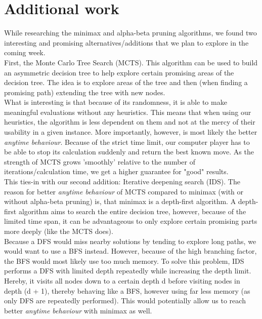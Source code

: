 \section{Additional work}
While researching the minimax and alpha-beta pruning algorithms, we found two interesting and promising alternatives/additions that we plan to explore in the coming week.\\
First, the Monte Carlo Tree Search (MCTS). This algorithm can be used to build an asymmetric decision tree to help explore certain promising areas of the decision tree. The idea is to explore areas of the tree and then (when finding a promising path) extending the tree with new nodes.\\
What is interesting is that because of its randomness, it is able to make meaningful evaluations without any heuristics. This means that when using our heuristics, the algorithm is less dependent on them and not at the mercy of their usability in a given instance. More importantly, however, is most likely the better \textit{anytime behaviour}. Because of the strict time limit, our computer player has to be able to stop its calculation suddenly and return the best known move. As the strength of MCTS grows 'smoothly' relative to the number of iterations/calculation time, we get a higher guarantee for "good" results.\\
This ties-in with our second addition: Iterative deepening search (IDS). The reason for better \textit{anytime behaviour} of MCTS compared to minimax (with or without alpha-beta pruning) is, that minimax is a depth-first algorithm. A depth-first algorithm aims to search the entire decision tree, however, because of the limited time span, it can be advantageous to only explore certain promising parts more deeply (like the MCTS does).\\
Because a DFS would miss nearby solutions by tending to explore long paths, we would want to use a BFS instead. However, because of the high branching factor, the BFS would most likely use too much memory. To solve this problem, IDS performs a DFS with limited depth repeatedly while increasing the depth limit. Hereby, it visits all nodes down to a certain depth d before visiting nodes in depth (d + 1), thereby behaving like a BFS, however using far less memory (as only DFS are repeatedly performed).
This would potentially allow us to reach better \textit{anytime behaviour} with minimax as well.